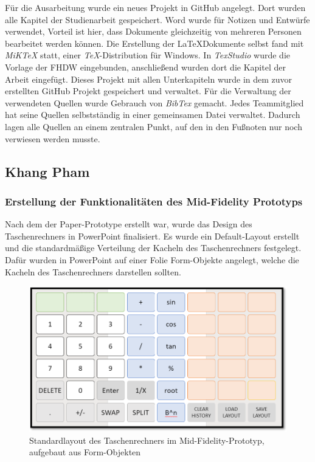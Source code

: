 Für die Ausarbeitung wurde ein neues Projekt in GitHub angelegt. Dort wurden alle Kapitel der Studienarbeit gespeichert. Word wurde für Notizen und Entwürfe verwendet, Vorteil ist hier, dass Dokumente gleichzeitig von mehreren Personen bearbeitet werden können. Die Erstellung der \LaTeX Dokumente selbst fand mit \textit{MiKTeX} statt, einer \textit{TeX}-Distribution für Windows. In \textit{TexStudio} wurde die Vorlage der FHDW eingebunden, anschließend wurden dort die Kapitel der Arbeit eingefügt. Dieses Projekt mit allen Unterkapiteln wurde in dem zuvor erstellten GitHub Projekt gespeichert und verwaltet. Für die Verwaltung der verwendeten Quellen wurde Gebrauch von \textit{BibTex} gemacht. Jedes Teammitglied hat seine Quellen selbstständig in einer gemeinsamen Datei verwaltet. Dadurch lagen alle Quellen an einem zentralen Punkt, auf den in den Fußnoten nur noch verwiesen werden musste. 

\clearpage

\subsection{Khang Pham}

\subsubsection{Erstellung der Funktionalitäten des Mid-Fidelity Prototyps}
\label{subsubsection:erstellung-funktionalitäten-mid-fidelity}

Nach dem der Paper-Prototype erstellt war, wurde das Design des Taschenrechners in PowerPoint finalisiert. Es wurde ein Default-Layout erstellt und die standardmäßige Verteilung der Kacheln des Taschenrechners festgelegt. Dafür wurden in PowerPoint auf einer Folie Form-Objekte angelegt, welche die Kacheln des Taschenrechners darstellen sollten.

\begin{figure}[!h]
	\includegraphics[scale=1]{img/standardlayout-mid-fielty}
	\caption[Standardlayout des Taschenrechners im Mid-Fidelity-Prototyp, aufgebaut aus Form-Objekten]{Standardlayout des Taschenrechners im Mid-Fidelity-Prototyp, aufgebaut aus Form-Objekten\footnotemark}
\end{figure}
\FloatBarrier

